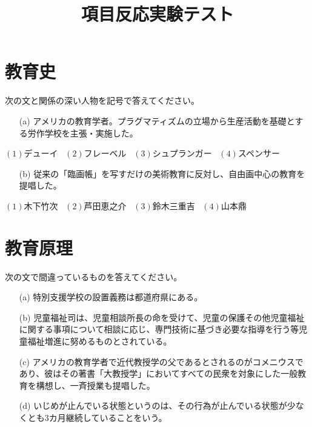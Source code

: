 \documentclass[10pt]{jarticle}
\title{項目反応実験テスト}
\begin{document}
\maketitle
\section{教育史}
次の文と関係の深い人物を記号で答えてください。
\begin{itemize}
  \item[(a)]アメリカの教育学者。プラグマティズムの立場から生産活動を基礎とする労作学校を主張・実施した。
\end{itemize}
\begin{center}
  $(1)$デューイ \ $(2)$フレーベル \ $(3)$シュプランガー \ $(4)$スペンサー
\end{center}
\begin{itemize}
  \item[(b)]従来の「臨画帳」を写すだけの美術教育に反対し、自由画中心の教育を提唱した。
\end{itemize}
\begin{center}
  $(1)$木下竹次 \ $(2)$芦田恵之介 \ $(3)$鈴木三重吉 \ $(4)$山本鼎
\end{center}
\section{教育原理}
次の文で間違っているものを答えてください。
\begin{itemize}
  \item[(a)]特別支援学校の設置義務は都道府県にある。
  \item[(b)]児童福祉司は、児童相談所長の命を受けて、児童の保護その他児童福祉に関する事項について相談に応じ、専門技術に基づき必要な指導を行う等児童福祉増進に努めるものとされている。
  \item[(c)]アメリカの教育学者で近代教授学の父であるとされるのがコメニウスであり、彼はその著書「大教授学」においてすべての民衆を対象にした一般教育を構想し、一斉授業も提唱した。
  \item[(d)]いじめが止んでいる状態というのは、その行為が止んでいる状態が少なくとも$3$カ月継続していることをいう。
\end{itemize}
\end{document}
